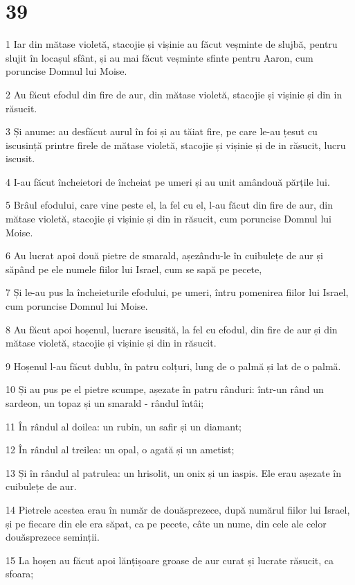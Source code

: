 \chapter{39}

\par 1 Iar din mătase violetă, stacojie și vișinie au făcut veșminte de slujbă, pentru slujit în locașul sfânt, și au mai făcut veșminte sfinte pentru Aaron, cum poruncise Domnul lui Moise.
\par 2 Au făcut efodul din fire de aur, din mătase violetă, stacojie și vișinie și din in răsucit.
\par 3 Și anume: au desfăcut aurul în foi și au tăiat fire, pe care le-au țesut cu iscusință printre firele de mătase violetă, stacojie și vișinie și de in răsucit, lucru iscusit.
\par 4 I-au făcut încheietori de încheiat pe umeri și au unit amândouă părțile lui.
\par 5 Brâul efodului, care vine peste el, la fel cu el, l-au făcut din fire de aur, din mătase violetă, stacojie și vișinie și din in răsucit, cum poruncise Domnul lui Moise.
\par 6 Au lucrat apoi două  pietre de smarald, așezându-le în cuibulețe de aur și săpând pe ele numele fiilor lui Israel, cum se sapă pe pecete,
\par 7 Și le-au pus la încheieturile efodului, pe umeri, întru pomenirea fiilor lui Israel, cum poruncise Domnul lui Moise.
\par 8 Au făcut apoi hoșenul, lucrare iscusită, la fel cu efodul, din fire de aur și din mătase violetă, stacojie și vișinie și din in răsucit.
\par 9 Hoșenul l-au făcut dublu, în patru colțuri, lung de o palmă și lat de o palmă.
\par 10 Și au pus pe el pietre scumpe, așezate în patru rânduri: într-un rând un sardeon, un topaz și un smarald - rândul întâi;
\par 11 În rândul al doilea: un rubin, un safir și un diamant;
\par 12 În rândul al treilea: un opal, o agată și un ametist;
\par 13 Și în rândul al patrulea: un hrisolit, un onix și un iaspis. Ele erau așezate în cuibulețe de aur.
\par 14 Pietrele acestea erau în număr de douăsprezece, după numărul fiilor lui Israel, și pe fiecare din ele era săpat, ca pe pecete, câte un nume, din cele ale celor douăsprezece seminții.
\par 15 La hoșen au făcut apoi lănțișoare groase de aur curat și lucrate răsucit, ca sfoara;
